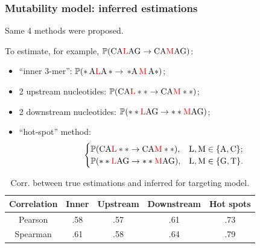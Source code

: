 \documentclass{beamer}\usepackage[]{graphicx}\usepackage[]{color}
\begin{document}
\begin{frame}
    \frametitle{Mutability model: inferred estimations}
    Same 4 methods were proposed.\\
    {\footnotesize
    To estimate, for example, $\mathbb P(\mathrm{CA{\color{red} L}AG} \to \mathrm{CA{\color{red}M}AG})$:%
    \begin{itemize}
        \item ``inner 3-mer'':
            \hfill    ${\mathbb P(\mathrm{*\,A{\color{red}L}A\,*} \to \, \mathrm{*A\,{\color{red}M\,}A*})}$;
        \item 2 upstream nucleotides:
            \hfill ${\mathbb P(\mathrm{CA{\color{red}L}**} \to \mathrm{CA{\color{red}M}**})}$;
        \item 2 downstream nucleotides:
            \hfill    ${\mathbb P(\mathrm{**{\color{red}L}AG} \to \mathrm{**{\color{red}M}AG})}$;
        \item ``hot-spot'' method:
                \begin{gather*}
                    \begin{cases}
                        \mathbb P(\mathrm{CA{\color{red}L}**} \to \mathrm{CA{\color{red}M}**}), & \mathrm{L, M} \in \{\mathrm{A, C}\}; \\
                        \mathbb P(\mathrm{**{\color{red}L}AG} \to \mathrm{**{\color{red}M}AG}), & \mathrm{L, M} \in \{\mathrm{G, T}\}. 
                     \end{cases}
                \end{gather*}
    \end{itemize}
}
    \begin{table}[]
    \centering
    \caption{Corr. between true estimations and inferred for targeting model.}
    \begin{tabular}{ccccc}
    \hline
    Correlation & Inner & Upstream & Downstream & Hot spots \\ \hline
    Pearson     & .58    & .57      & .61        & { \color{red}.73}       \\
    Spearman    & .61    & .58      & .64        & { \color{red}.79}     
    \end{tabular}
    \end{table}
\end{frame}
\end{document}
